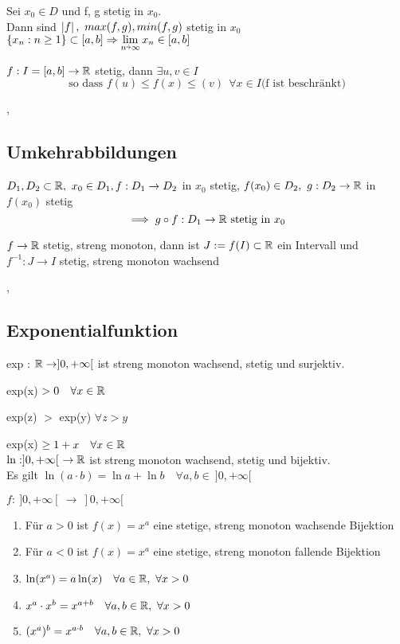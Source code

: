 \Lemma[3.4.3] Sei $x_0 \in D$ und f, g stetig in $x_0$. \\
Dann sind $\left\lvert f \right\rvert, \ max(f, g), min(f, g)$ stetig in $x_0$ \\

\Lemma[3.4.4] $\{x_n : n \geq 1\} \subset [a, b] \Rightarrow  \lim\limits_{n \veryshortarrow \infty} x_n \in [a, b]$

\Satz[3.4.5] $f: I =  [a, b] \rightarrow \mathbb{R}$ stetig, dann $\exists u, v \in I$
\[ \text{so dass } f(u) \leq f(x) \leq(v) \ \ \forall x \in I \text{(f ist beschränkt)} \]

\sep

\subsection{Umkehrabbildungen}

\Satz[3.5.1] $D_1, D_2 \subset \mathbb{R}, \ x_0 \in D_1, f : D_1 \rightarrow D_2$ in $x_0$ stetig, $f(x_0) \in D_2, \ g : D_2 \rightarrow \mathbb{R}$ in $f(x_0)$ stetig
\[ \implies g \circ f : D_1 \rightarrow \mathbb{R}  \text{ stetig in } x_0 \] 

\Satz[3.5.3]$f \rightarrow \mathbb{R}$ stetig, streng monoton, dann ist $J := f(I) \subset \mathbb{R}$ ein Intervall und $f^{-1} : J \rightarrow I$ stetig, streng monoton wachsend

\sep

\subsection{Exponentialfunktion}

\Satz[3.6.1] exp : $\mathbb{R} \rightarrow ]0, + \infty[$ ist streng monoton wachsend, stetig und surjektiv.

\Korollar[3.6.2] exp(x) $> 0 \quad \forall x \in \mathbb{R}$ 

\Korollar[3.6.3] exp(z) $>$ exp(y) $\forall z > y$

\Korollar[3.6.4] exp(x) $\geq  1 + x \quad \forall x \in \mathbb{R}$ \\

\Korollar[3.6.5] $ \ln : ]0, + \infty[ \ \rightarrow \mathbb{R}$ ist streng monoton wachsend, stetig und bijektiv. \\
Es gilt \( \ln(a \cdot b) = \ln a + \ln b \quad \forall a, b \in \ ]0, +\infty[ \)

\Korollar[3.6.6] $f : \ ]0, + \infty[ \ \rightarrow \  ]0, + \infty[$
\begin{enumerate}
\item Für $a > 0$ ist $f(x) = x^a$ eine stetige, streng monoton wachsende Bijektion
\item Für $a < 0$ ist $f(x) = x^a$ eine stetige, streng monoton fallende Bijektion
\item $\ln(x^a) = a \ln(x) \quad \forall a \in \mathbb{R}, \ \forall x > 0$
\item $x^a \cdot x^b = x^{a + b} \quad \forall a, b \in \mathbb{R}, \ \forall x > 0$
\item $(x^a)^b = x^{a \cdot b} \quad \forall a, b \in \mathbb{R}, \ \forall x > 0$
\end{enumerate}

